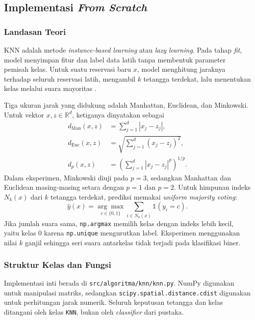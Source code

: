 \subsection{Implementasi \textit{From Scratch}}
\label{subsec:knn-implementasi}

\subsubsection{Landasan Teori}
KNN adalah metode \textit{instance-based learning} atau \textit{lazy learning}. Pada tahap \textit{fit}, model menyimpan fitur dan label data latih tanpa membentuk parameter pemisah kelas. Untuk suatu reservasi baru $x$, model menghitung jaraknya terhadap seluruh reservasi latih, mengambil $k$ tetangga terdekat, lalu menentukan kelas melalui suara mayoritas \cite{slide-knn,cunningham2020knn}.

Tiga ukuran jarak yang didukung adalah Manhattan, Euclidean, dan Minkowski. Untuk vektor $x,z\in\mathbb{R}^{d}$, ketiganya dinyatakan sebagai
\begin{equation}
 \begin{aligned}
 d_{\mathrm{Man}}(x,z) &= \sum_{j=1}^{d}|x_j-z_j|, \\
 d_{\mathrm{Euc}}(x,z) &= \sqrt{\sum_{j=1}^{d}(x_j-z_j)^2}, \\
 d_{p}(x,z) &= \left(\sum_{j=1}^{d}|x_j-z_j|^{p}\right)^{1/p}.
 \end{aligned}
 \label{eq:knn-jarak}
\end{equation}
Dalam eksperimen, Minkowski diuji pada $p=3$, sedangkan Manhattan dan Euclidean masing-masing setara dengan $p=1$ dan $p=2$. Untuk himpunan indeks $N_k(x)$ dari $k$ tetangga terdekat, prediksi memakai \textit{uniform majority voting}:
\begin{equation}
 \hat y(x)=\underset{c\in\{0,1\}}{\arg\max}\sum_{i\in N_k(x)}\mathbb{1}(y_i=c).
 \label{eq:knn-voting}
\end{equation}
Jika jumlah suara sama, \texttt{np.argmax} memilih kelas dengan indeks lebih kecil, yaitu kelas 0 karena \texttt{np.unique} mengurutkan label. Eksperimen menggunakan nilai $k$ ganjil sehingga seri suara antarkelas tidak terjadi pada klasifikasi biner.

\subsubsection{Struktur Kelas dan Fungsi}
Implementasi inti berada di \nolinkurl{src/algoritma/knn/knn.py}. NumPy digunakan untuk manipulasi matriks, sedangkan \texttt{scipy.spatial.distance.cdist} digunakan untuk perhitungan jarak numerik. Seluruh keputusan tetangga dan kelas ditangani oleh kelas \texttt{KNN}, bukan oleh \textit{classifier} dari pustaka.

